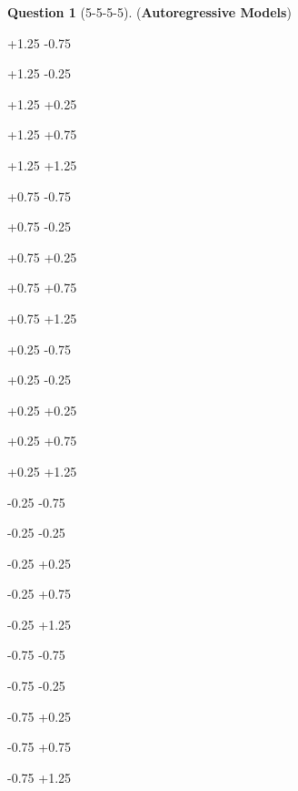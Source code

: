 \documentclass[12pt]{article}
\newif\ifexercise
\theoremstyle{definition}
\newtheorem{exercise}{Question}%
\newcommand{\Exercise}[1]{
\ifexercise#1\fi
}
\begin{document}
\begin{exercise}[5-5-5-5] (\textbf{Autoregressive Models})
\newcommand\pixelcnnnewcoor[3]%
   {\expandafter\def\csname pixelcnncy:#1\endcsname{#2}
    \expandafter\def\csname pixelcnncx:#1\endcsname{#3}%
    }
\newcommand\pixelcnncx[1]{\expandafter\csname pixelcnncx:#1\endcsname}
\newcommand\pixelcnncy[1]{\expandafter\csname pixelcnncy:#1\endcsname}


\newcommand{\visible}[1]{
\node[fill=black!20] at (\pixelcnncx{#1},\pixelcnncy{#1}) {};
}
\pixelcnnnewcoor{11}{+1.25}{-0.75}
\pixelcnnnewcoor{12}{+1.25}{-0.25}
\pixelcnnnewcoor{13}{+1.25}{+0.25}
\pixelcnnnewcoor{14}{+1.25}{+0.75}
\pixelcnnnewcoor{15}{+1.25}{+1.25}
\pixelcnnnewcoor{21}{+0.75}{-0.75}
\pixelcnnnewcoor{22}{+0.75}{-0.25}
\pixelcnnnewcoor{23}{+0.75}{+0.25}
\pixelcnnnewcoor{24}{+0.75}{+0.75}
\pixelcnnnewcoor{25}{+0.75}{+1.25}
\pixelcnnnewcoor{31}{+0.25}{-0.75}
\pixelcnnnewcoor{32}{+0.25}{-0.25}
\pixelcnnnewcoor{33}{+0.25}{+0.25}
\pixelcnnnewcoor{34}{+0.25}{+0.75}
\pixelcnnnewcoor{35}{+0.25}{+1.25}
\pixelcnnnewcoor{41}{-0.25}{-0.75}
\pixelcnnnewcoor{42}{-0.25}{-0.25}
\pixelcnnnewcoor{43}{-0.25}{+0.25}
\pixelcnnnewcoor{44}{-0.25}{+0.75}
\pixelcnnnewcoor{45}{-0.25}{+1.25}
\pixelcnnnewcoor{51}{-0.75}{-0.75}
\pixelcnnnewcoor{52}{-0.75}{-0.25}
\pixelcnnnewcoor{53}{-0.75}{+0.25}
\pixelcnnnewcoor{54}{-0.75}{+0.75}
\pixelcnnnewcoor{55}{-0.75}{+1.25}
\newcommand{\drawgrid}{
\draw[step=0.5cm,color=gray] (-1.00,-1.00) grid (1.50,1.50);
\foreach \y [count=\yi] in {+1.25,+0.75,+0.25,-0.25,-0.75}
\foreach \x [count=\xi] in {-0.75,-0.25,0.25,0.75,1.25}
    \node at (\x,\y)
    {{\small \yi\xi}};
}
\Exercise{
\label{ex:pixcnn_masks}
One way to enforce autoregressive conditioning is via masking the weight parameters. 
\footnote{
An example of this is the use of masking in the Transformer architecture.
}
Consider a two-hidden-layer convolutional neural network without kernel flipping, with kernel size $3\times3$ and padding size $1$ on each border (so that an input feature map of size $5\times5$ is convolved into a $5\times5$ output). 
Define mask of type A and mask of type B as 
\begin{align*}
(\mM^A)_{::ij}:=\begin{cases}
1 & \text{if $i < 2$}\\
1 & \text{if $i = 2$ and $j<2$}\\
0 & \text{elsewhere}
\end{cases}
\qquad
(\mM^B)_{::ij}:=\begin{cases}
1 & \text{if $i < 2$}\\

\end{cases}
\end{align*}}
\end{exercise}
\end{document}
